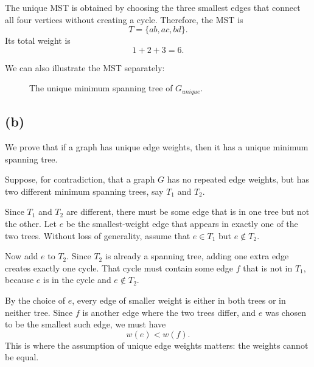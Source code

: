\documentclass{brockcosc3p03}
\begin{document}
The unique MST is obtained by choosing the three smallest edges that connect all four vertices without creating a cycle. Therefore, the MST is
\[
T = \{ab, ac, bd\}.
\]
Its total weight is
\[
1 + 2 + 3 = 6.
\]

We can also illustrate the MST separately:

\begin{figure}[H]
\centering
{}

\caption{The unique minimum spanning tree of $G_{unique}$.}
\label{fig:gunique-mst}
\end{figure}

\subsection*{(b)}

We prove that if a graph has unique edge weights, then it has a unique minimum spanning tree.

Suppose, for contradiction, that a graph $G$ has no repeated edge weights, but has two different minimum spanning trees, say $T_1$ and $T_2$.

Since $T_1$ and $T_2$ are different, there must be some edge that is in one tree but not the other. Let $e$ be the smallest-weight edge that appears in exactly one of the two trees. Without loss of generality, assume that $e \in T_1$ but $e \notin T_2$.

Now add $e$ to $T_2$. Since $T_2$ is already a spanning tree, adding one extra edge creates exactly one cycle. That cycle must contain some edge $f$ that is not in $T_1$, because $e$ is in the cycle and $e \notin T_2$.

By the choice of $e$, every edge of smaller weight is either in both trees or in neither tree. Since $f$ is another edge where the two trees differ, and $e$ was chosen to be the smallest such edge, we must have
\[
w(e) < w(f).
\]
This is where the assumption of unique edge weights matters: the weights cannot be equal.
\end{document}
